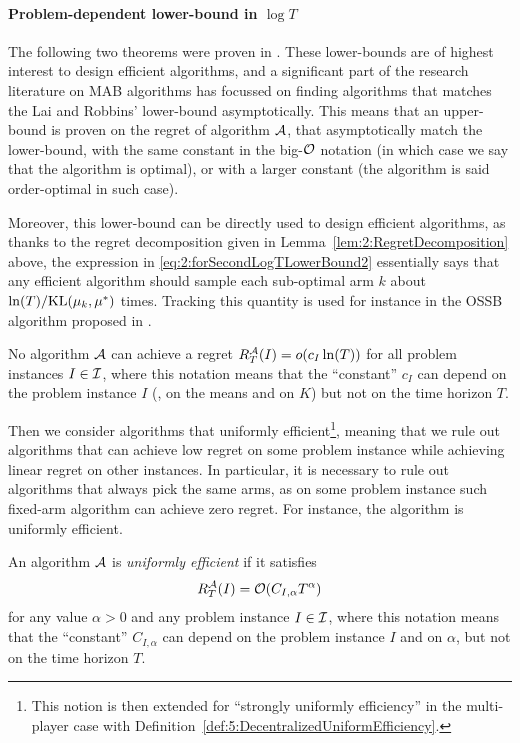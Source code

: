 \paragraph{Problem-dependent lower-bound in $\log T$}

The following two theorems were proven in \cite{LaiRobbins85}.
These lower-bounds are of highest interest to design efficient algorithms,
and a significant part of the research literature on MAB algorithms has focussed on finding algorithms that matches the Lai and Robbins' lower-bound asymptotically.
This means that an upper-bound is proven on the regret of algorithm $\mathcal{A}$, that asymptotically match the lower-bound, with the same constant in the big-$\mathcal{O}$ notation (in which case we say that the algorithm is optimal), or with a larger constant (the algorithm is said order-optimal in such case).

Moreover, this lower-bound can be directly used to design efficient algorithms, as thanks to the regret decomposition given in Lemma~\ref{lem:2:RegretDecomposition} above, the expression in \eqref{eq:2:forSecondLogTLowerBound2} essentially says that any efficient algorithm
should sample each sub-optimal arm $k$ about $\ln(T)/\mathrm{KL}(\mu_k,\mu^*)$ times.
Tracking this quantity is used for instance in the OSSB algorithm proposed in \cite{Combes17}.

\begin{theorem}\label{thm:2:firstLogTLowerBound}
    No algorithm $\mathcal{A}$ can achieve a regret $R_T^{\mathcal{A}}(I) = \mathop{}\mathopen{}o\mathopen{}\left(c_I \ln(T)\right)$ for all problem instances $I \in \mathcal{I}$,
    where this notation means that the ``constant'' $c_I$ can depend on the problem instance $I$ (\eg, on the means and on $K$) but not on the time horizon $T$.
\end{theorem}

Then we consider algorithms that uniformly efficient\footnote{This notion is then extended for ``strongly uniformly efficiency'' in the multi-player case with Definition~\ref{def:5:DecentralizedUniformEfficiency}.}, meaning that we rule out algorithms that can achieve low regret on some problem instance while achieving linear regret on other instances.
In particular, it is necessary to rule out algorithms that always pick the same arms, as on some problem instance such fixed-arm algorithm can achieve zero regret.
For instance, the \UCB{} algorithm is uniformly efficient.

\begin{defn}\label{def:2:uniformlyEfficientAlgorithm}
    An algorithm $\mathcal{A}$ is \emph{uniformly efficient} if it satisfies
    \begin{equation}
        R_T^{\mathcal{A}}(I) = \mathop{}\mathopen{}\mathcal{O}\mathopen{}\left(C_{I,\alpha} T^{\alpha}\right)
    \end{equation}
    for any value $\alpha>0$ and any problem instance $I\in \mathcal{I}$,
    where this notation means that the ``constant'' $C_{I,\alpha}$ can depend on the problem instance $I$ and on $\alpha$, but not on the time horizon $T$.
\end{defn}

